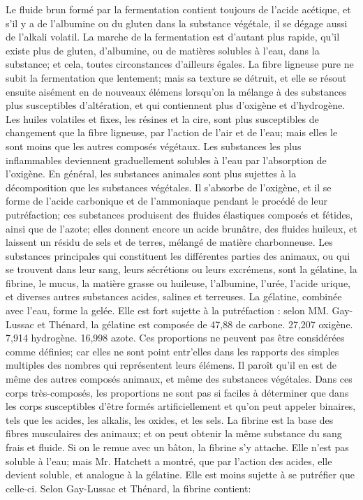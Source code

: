 Le fluide brun formé par la fermentation contient toujours de l'acide acétique, et s'il y a de l'albumine ou du gluten dans la substance végétale, il se dégage aussi de l'alkali volatil.
La marche de la fermentation est d'autant plus rapide, qu'il existe plus de gluten, d'albumine, ou de matières solubles à l'eau, dans la substance; et cela, toutes circonstances d'ailleurs égales. La fibre ligneuse pure ne subit la fermentation que lentement; mais sa texture se détruit, et elle se résout ensuite aisément en de nouveaux élémens lorsqu'on la mélange à des substances plus susceptibles d'altération, et qui contiennent plus d'oxigène et d'hydrogène. Les huiles volatiles et fixes, les résines et la cire, sont plus susceptibles de changement que la fibre ligneuse, par l'action de l'air et de l'eau; mais elles le sont moins que les autres composés végétaux. Les substances\setcounter{page}{152} les plus inflammables deviennent graduellement solubles à l'eau par l'absorption de l'oxigène.
En général, les substances animales sont plus sujettes à la décomposition que les substances végétales. Il s'absorbe de l'oxigène, et il se forme de l'acide carbonique et de l'ammoniaque pendant le procédé de leur putréfaction; ces substances produisent des fluides élastiques composés et fétides, ainsi que de l'azote; elles donnent encore un acide brunâtre, des fluides huileux, et laissent un résidu de sels et de terres, mélangé de matière charbonneuse. Les substances principales qui constituent les différentes parties des animaux, ou qui se trouvent dans leur sang, leurs sécrétions ou leurs excrémens, sont la gélatine, la fibrine, le mucus, la matière grasse ou huileuse, l'albumine, l'urée, l'acide urique, et diverses autres substances acides, salines et terreuses.
La gélatine, combinée avec l'eau, forme la gelée. Elle est fort sujette à la putréfaction : selon MM. Gay-Lussac et Thénard, la gélatine est composée de
47,88 de carbone.
27,207 oxigène.
7,914 hydrogène.
16,998 azote.
\setcounter{page}{153} Ces proportions ne peuvent pas être considérées comme définies; car elles ne sont point entr'elles dans les rapports des simples multiples des nombres qui représentent leurs élémens. Il paroît qu'il en est de même des autres composés animaux, et même des substances végétales. Dans ces corps très-composés, les proportions ne sont pas si faciles à déterminer que dans les corps susceptibles d'être formés artificiellement et qu'on peut appeler binaires, tels que les acides, les alkalis, les oxides, et les sels.
La fibrine est la base des fibres musculaires des animaux; et on peut obtenir la même substance du sang frais et fluide. Si on le remue avec un bâton, la fibrine s'y attache. Elle n'est pas soluble à l'eau; mais Mr. Hatchett a montré, que par l'action des acides, elle devient soluble, et analogue à la gélatine. Elle est moins sujette à se putréfier que celle-ci. Selon Gay-Lussac et Thénard, la fibrine contient:
